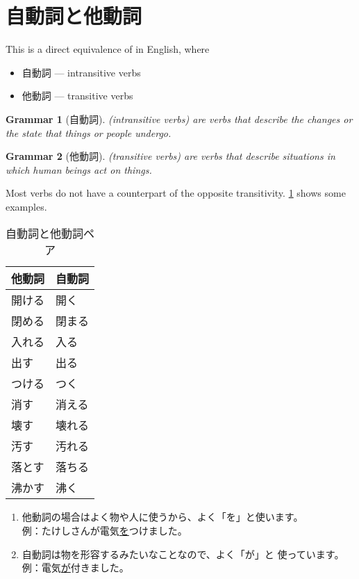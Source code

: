 \documentclass[notoc,notitlepage]{tufte-book}
\newtheorem{grammar}{\faBook Grammar}
\begin{document}

\section{自動詞と他動詞}%
\label{sec:jidoushi_to_tadoushi}

This is a direct equivalence of  in English, where
\begin{itemize}
  \item 自動詞 --- intransitive verbs
  \item 他動詞 --- transitive verbs
\end{itemize}

\begin{grammar}[自動詞]\label{grammar:jidoushi}
   (intransitive verbs) are verbs that describe the changes or
  the state that things or people undergo.
\end{grammar}

\begin{grammar}[他動詞]\label{grammar:tadoushi}
   (transitive verbs) are verbs that describe
  situations in which human beings act on things.
\end{grammar}

Most verbs do not have a counterpart of the opposite transitivity.
\cref{table:transitive_intransitive_verb_pair} shows some examples.

\begin{table}[ht]
  \centering
  \caption{自動詞と他動詞ペア}
  \label{table:transitive_intransitive_verb_pair}
  \begin{tabular}{l | l}
    他動詞 & 自動詞 \\
    \hline
    開ける & 開く \\
    閉める & 閉まる \\
    入れる & 入る \\
    出す   & 出る \\
    つける & つく \\
    消す   & 消える \\
    壊す   & 壊れる \\
    汚す   & 汚れる \\
    落とす & 落ちる \\
    沸かす & 沸く
  \end{tabular}
\end{table}

\begin{note}
  \begin{enumerate}
    \item 他動詞の場合はよく物や人に使うから、よく「を」と使います。 \\
      例：たけしさんが電気\underline{を}つけました。
    \item 自動詞は物を形容するみたいなことなので、よく「が」と
      使っています。 \\
      例：電気\underline{が}付きました。
  \end{enumerate}
\end{note}
\end{document}
